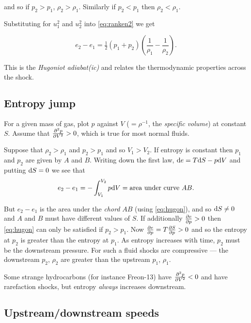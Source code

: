 \documentclass{notes}
\begin{document}
and so if $p_2 > p_1$, $\rho_2 > \rho_1$.  Similarly if $p_2 < p_1$ then
$\rho_2 < \rho_1$.

Substituting for $u_1^2$ and $u_2^2$ into \eqref{eq:ranken2} we get

\begin{equation}\label{eq:hugon}
e_2 - e_1 = \tfrac{1}{2} \left(p_1 +p_2 \right) \left(\frac{1}{\rho_1}
- \frac{1}{\rho_2} \right).
\end{equation}

This is the \emph{Hugoniot adiabat(ic)} and relates the thermodynamic
properties across the shock.

\subsection{Entropy jump}

For a given mass of gas, plot $p$ against $V$ ($=\rho^{-1}$, the
\emph{specific volume}) at constant $S$.  Assume that $\frac{\partial ^2 p}{\partial V^2} >0$,
which is true for most normal fluids.

\vspace{2in}

Suppose that $\rho_2 > \rho_1$ and $p_2 > p_1$ and so $V_1 > V_2$.  If 
entropy is constant then $p_1$ and $p_2$ are given by $A$ and $B$.  Writing
down the first law, $\mathrm{d} e = T \mathrm{d} S - p \mathrm{d} V$ and putting $\mathrm{d} S =0$
we see that
\[
e_2 - e_1 = - \int_{V_1}^{V_2} p \mathrm{d} V
= \text{area under curve $AB$.}
\]

But $e_2 - e_1$ is the area under the \emph{chord} $AB$
(using \eqref{eq:hugon}), and so $\mathrm{d} S \neq 0$ and $A$ and
$B$ must have different values of $S$.  If additionally
$\frac{\partial e}{\partial p} > 0$ then \eqref{eq:hugon} can only be satisfied if
$p_2 > p_1$. Now
$\frac{\partial e}{\partial p} = T \frac{\partial S}{\partial p} > 0$ and so the entropy at $p_2$ is greater
than the entropy at $p_1$. As entropy increases with time, $p_2$
must be the downstream pressure.  For such a fluid shocks are compressive ---
the downstream $p_2$, $\rho_2$ are greater than the upstream
$p_1$, $\rho_1$.

Some strange hydrocarbons (for instance Freon-13) have
$\frac{\partial ^2 p}{\partial V^2} < 0$ and have rarefaction shocks, but entropy \emph{always}
increases downstream.

\subsection{Upstream/downstream speeds}

\vspace{1.5in}
\end{document}
